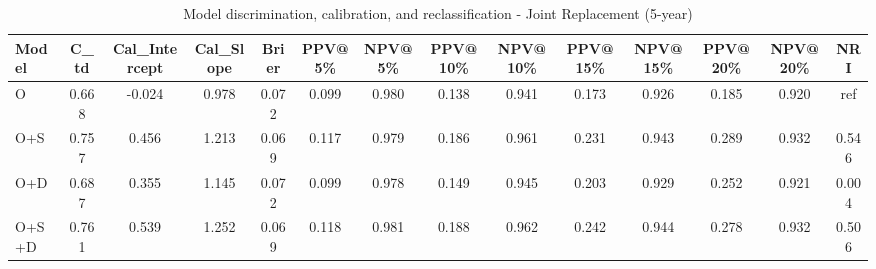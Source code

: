 \begin{table}[htbp]
\centering
\small
\caption{Model discrimination, calibration, and reclassification - Joint Replacement (5-year)}
\label{tab:perf_joint_5y}
\begin{tabular}{lccccccccccccc}
\toprule
Model & C\_td & Cal\_Intercept & Cal\_Slope & Brier & PPV@5\% & NPV@5\% & PPV@10\% & NPV@10\% & PPV@15\% & NPV@15\% & PPV@20\% & NPV@20\% & NRI \\
\midrule
O & 0.668 & -0.024 & 0.978 & 0.072 & 0.099 & 0.980 & 0.138 & 0.941 & 0.173 & 0.926 & 0.185 & 0.920 & ref \\
O+S & 0.757 & 0.456 & 1.213 & 0.069 & 0.117 & 0.979 & 0.186 & 0.961 & 0.231 & 0.943 & 0.289 & 0.932 & 0.546 \\
O+D & 0.687 & 0.355 & 1.145 & 0.072 & 0.099 & 0.978 & 0.149 & 0.945 & 0.203 & 0.929 & 0.252 & 0.921 & 0.004 \\
O+S+D & 0.761 & 0.539 & 1.252 & 0.069 & 0.118 & 0.981 & 0.188 & 0.962 & 0.242 & 0.944 & 0.278 & 0.932 & 0.506 \\
\bottomrule
\end{tabular}
\end{table}